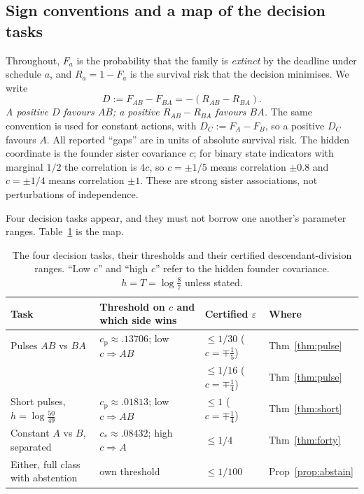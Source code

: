 \documentclass[11pt]{article}
\theoremstyle{plain}
\theoremstyle{definition}
\theoremstyle{remark}
\newcommand{\eps}{\varepsilon}
\newcommand{\cp}{c_{\mathrm p}}
\begin{document}
\subsection{Sign conventions and a map of the decision tasks}
\label{sec:conventions}

Throughout, $F_a$ is the probability that the family is \emph{extinct} by the
deadline under schedule $a$, and $R_a=1-F_a$ is the survival risk that the
decision minimises. We write
\[
 D:=F_{AB}-F_{BA}=-(R_{AB}-R_{BA}).
\]
\emph{A positive $D$ favours $AB$; a positive $R_{AB}-R_{BA}$ favours $BA$.}
The same convention is used for constant actions, with $D_C:=F_A-F_B$, so a
positive $D_C$ favours $A$. All reported ``gaps'' are in units of absolute
survival risk. The hidden coordinate is the founder sister covariance $c$; for
binary state indicators with marginal $1/2$ the correlation is $4c$, so
$c=\pm1/5$ means correlation $\pm0.8$ and $c=\pm1/4$ means correlation $\pm1$.
These are strong sister associations, not perturbations of independence.

Four decision tasks appear, and they must not borrow one another's parameter
ranges. Table~\ref{tab:map} is the map.

\begin{table}[tb]
\centering\small
\caption{The four decision tasks, their thresholds and their certified
descendant-division ranges. ``Low $c$'' and ``high $c$'' refer to the hidden
founder covariance. $h=T=\log\frac87$ unless stated.}
\label{tab:map}
\begin{tabularx}{\linewidth}{@{}lXll@{}}
\toprule
Task & Threshold on $c$ and which side wins & Certified $\eps$ & Where\\\midrule
Pulses $AB$ vs $BA$ & $\cp\approx.13706$; low $c\Rightarrow AB$ & $\le1/30$ ($c=\mp\frac15$) & Thm~\ref{thm:pulse}\\
 & & $\le1/16$ ($c=\mp\frac14$) & Thm~\ref{thm:pulse}\\
Short pulses, $h=\log\frac{50}{49}$ & $\cp\approx.01813$; low $c\Rightarrow AB$ & $\le1$ ($c=\mp\frac14$) & Thm~\ref{thm:short}\\
Constant $A$ vs $B$, separated & $c_*\approx.08432$; high $c\Rightarrow A$ & $\le1/4$ & Thm~\ref{thm:forty}\\
Either, full class with abstention & own threshold & $\le1/100$ & Prop~\ref{prop:abstain}\\
\bottomrule
\end{tabularx}
\end{table}
\end{document}
